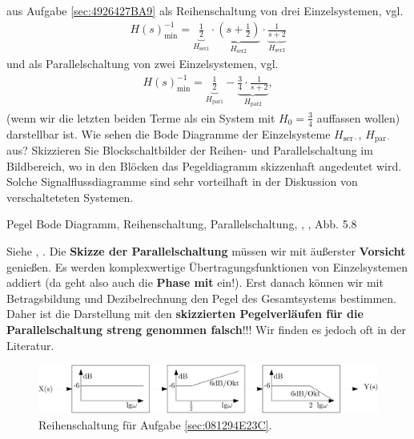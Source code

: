 aus Aufgabe \ref{sec:4926427BA9}
als Reihenschaltung von drei Einzelsystemen, vgl. 
\begin{align}
H(s)_\mathrm{min}^{-1} = \underbrace{\frac{1}{2}}_{H_{\mathrm{ser}1}} \cdot \underbrace{(s+\frac{1}{2})}_{H_{\mathrm{ser}2}} \cdot \underbrace{\frac{1}{s+2}}_{H_{\mathrm{ser}3}}
\end{align}
und als Parallelschaltung von zwei Einzelsystemen, vgl. 
\begin{align}
H(s)_\mathrm{min}^{-1} = \underbrace{\frac{1}{2}}_{H_{\mathrm{par}1}} - \underbrace{\frac{3}{4}\cdot\frac{1}{s+2}}_{H_\mathrm{par2}},
\end{align}
(wenn wir die letzten beiden Terme als ein System mit $H_0=\frac{3}{4}$ auffassen
wollen) darstellbar ist.
%
Wie sehen die Bode Diagramme der Einzelsysteme $H_{\mathrm{ser}\cdot}$,
$H_{\mathrm{par}\cdot}$ aus?
%
Skizzieren Sie Blockschaltbilder der Reihen- und Parallelschaltung im Bildbereich,
wo in den Blöcken das Pegeldiagramm skizzenhaft angedeutet wird.
Solche Signalflussdiagramme sind sehr vorteilhaft in der Diskussion von
verschalteteten Systemen.

\begin{Werkzeug}
Pegel Bode Diagramm, Reihenschaltung, Parallelschaltung,
, , Abb. 5.8
\end{Werkzeug}
\begin{Loesung}
Siehe , .
Die \textbf{Skizze der Parallelschaltung} müssen wir mit äußerster \textbf{Vorsicht} genießen.
Es werden komplexwertige Übertragungsfunktionen von Einzelsystemen addiert
(da geht also auch die \textbf{Phase mit} ein!). Erst danach können wir mit
Betragsbildung und Dezibelrechnung den Pegel des Gesamtsystems bestimmen.
Daher ist die Darstellung mit den \textbf{skizzierten Pegelverläufen für die
Parallelschaltung streng genommen falsch}!!!
Wir finden es jedoch oft in der Literatur.
\end{Loesung}

\begin{figure}[h]
\centering
\includegraphics[width=1\textwidth]{../system_properties_ct/cascade_081294E23C.png}
\caption{Reihenschaltung für Aufgabe \ref{sec:081294E23C}.}
\label{fig:cascade_081294E23C}
\end{figure}


